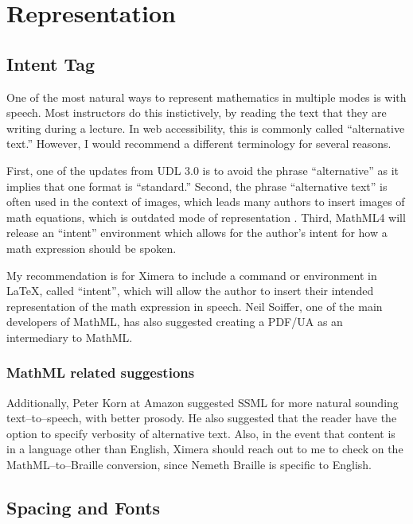 \documentclass{ximera}
\begin{document}
\section{Representation}

\subsection{Intent Tag}

One of the most natural ways to represent mathematics in multiple modes is with speech. Most instructors
do this instictively, by reading the text that they are writing during a lecture. In web accessibility, 
this is commonly called ``alternative text.'' However, I would recommend a different terminology for
several reasons. 

First, one of the updates from UDL 3.0 is to avoid the phrase ``alternative'' as it implies that one 
format is ``standard.'' Second, the phrase ``alternative text'' is often used in the context of images, 
which leads many authors to insert images of math equations, which is outdated mode of representation 
\cite{PSU}. Third, MathML4 will release an ``intent'' environment which allows for the author's intent
for how a math expression should be spoken. 

My recommendation is for Ximera to include a command or environment in LaTeX, called ``intent'', 
which will allow the author to insert their intended representation of the math expression in speech.
Neil Soiffer, one of the main developers of MathML, has also 
suggested creating a PDF/UA as an intermediary to MathML.

\subsubsection{MathML related suggestions}

Additionally, Peter Korn at Amazon suggested SSML for more natural sounding text--to--speech, with better
prosody. He also suggested that the reader have the option to specify verbosity of alternative text. 
Also, in the event that content is in a language other than English, Ximera should reach out 
to me to check on the MathML--to--Braille conversion, since Nemeth Braille is specific to English. 

\subsection{Spacing and Fonts}
\end{document}
